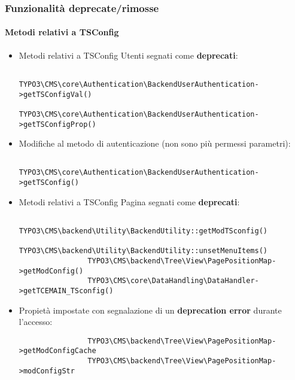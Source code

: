 
\begin{frame}[fragile]
	\frametitle{Funzionalità deprecate/rimosse}
	\framesubtitle{Metodi relativi a TSConfig}

	\lstset{basicstyle=\tiny\ttfamily}

	\begin{itemize}
		\item Metodi relativi a TSConfig Utenti segnati come \textbf{deprecati}:

			\begin{lstlisting}
				TYPO3\CMS\core\Authentication\BackendUserAuthentication->getTSConfigVal()
				TYPO3\CMS\core\Authentication\BackendUserAuthentication->getTSConfigProp()
			\end{lstlisting}

		\item Modifiche al metodo di autenticazione (non sono più permessi parametri):

			\begin{lstlisting}
				TYPO3\CMS\core\Authentication\BackendUserAuthentication->getTSConfig()
			\end{lstlisting}

		\item Metodi relativi a TSConfig Pagina segnati come \textbf{deprecati}:

			\begin{lstlisting}
				TYPO3\CMS\backend\Utility\BackendUtility::getModTSconfig()
				TYPO3\CMS\backend\Utility\BackendUtility::unsetMenuItems()
				TYPO3\CMS\backend\Tree\View\PagePositionMap->getModConfig()
				TYPO3\CMS\core\DataHandling\DataHandler->getTCEMAIN_TSconfig()
			\end{lstlisting}

		\item Propietà impostate con segnalazione di un \textbf{deprecation error} durante l'accesso:

			\begin{lstlisting}
				TYPO3\CMS\backend\Tree\View\PagePositionMap->getModConfigCache
				TYPO3\CMS\backend\Tree\View\PagePositionMap->modConfigStr
			\end{lstlisting}

	\end{itemize}

\end{frame}


